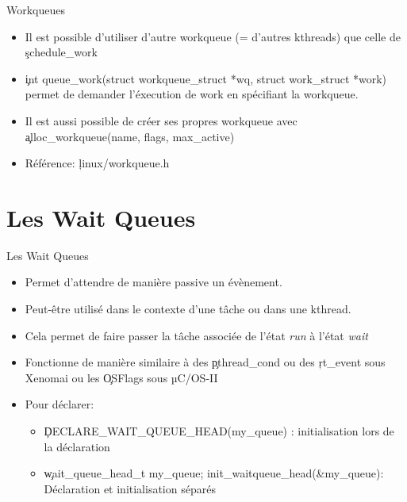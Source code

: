 \begin{frame}[fragile=singleslide]{Workqueues}
  \begin{itemize} 
  \item  Il  est possible  d'utiliser  d'autre  workqueue (=  d'autres
    kthreads) que celle de \c{schedule_work}
  \item
    \c{int queue_work(struct workqueue_struct *wq, struct work_struct *work)}
    permet de demander l'éxecution de work en spécifiant la workqueue.
  \item  Il est  aussi possible  de créer  ses propres  workqueue avec
    \c{alloc_workqueue(name, flags, max_active)}
  \item Référence: \c{linux/workqueue.h}
  \end{itemize}
\end{frame}

\section{Les Wait Queues}

\begin{frame}[fragile=singleslide]{Les Wait Queues}
  \begin{itemize} 
  \item Permet d'attendre de manière passive un évènement. 
  \item Peut-être utilisé
    dans le contexte d'une tâche ou dans une kthread.
  \item  Cela  permet  de  faire  passer la  tâche  associée  de  l'état
    \emph{run} à l'état \emph{wait}
  \item Fonctionne de manière similaire à des \c{pthread_cond} ou des \c{rt_event} sous Xenomai ou les \c{OSFlags} sous µC/OS-II
  \item Pour déclarer:
    \begin{itemize} 
    \item \c{DECLARE_WAIT_QUEUE_HEAD(my_queue)} : initialisation lors de
      la déclaration
    \item \c{wait_queue_head_t  my_queue; init_waitqueue_head(&my_queue)}:  Déclaration  et initialisation
      séparés
    \end{itemize} 
  \end{itemize}
\end{frame}

